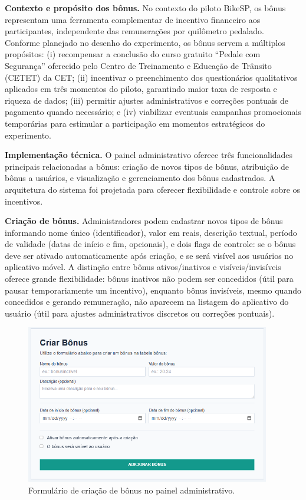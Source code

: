 

\textbf{Contexto e propósito dos bônus.} No contexto do piloto BikeSP, os bônus
representam uma ferramenta complementar de incentivo financeiro aos participantes,
independente das remunerações por quilômetro pedalado. Conforme planejado no desenho
do experimento, os bônus servem a múltiplos propósitos: (i) recompensar a conclusão
do curso gratuito ``Pedale com Segurança'' oferecido pelo Centro de Treinamento e
Educação de Trânsito (CETET) da CET; (ii) incentivar o preenchimento dos
questionários qualitativos aplicados em três momentos do piloto, garantindo maior
taxa de resposta e riqueza de dados; (iii) permitir ajustes administrativos e
correções pontuais de pagamento quando necessário; e (iv) viabilizar eventuais
campanhas promocionais temporárias para estimular a participação em momentos
estratégicos do experimento.

\textbf{Implementação técnica.} O painel administrativo oferece três
funcionalidades principais relacionadas a bônus: criação de novos tipos de bônus,
atribuição de bônus a usuários, e visualização e gerenciamento dos bônus
cadastrados. A arquitetura do sistema foi projetada para oferecer flexibilidade e controle sobre os incentivos.

\textbf{Criação de bônus.} Administradores podem cadastrar novos tipos de bônus
informando nome único (identificador), valor em reais, descrição textual, período
de validade (datas de início e fim, opcionais), e dois flags de controle: se o
bônus deve ser ativado automaticamente após criação, e se será visível aos
usuários no aplicativo móvel. A distinção entre bônus ativos/inativos e
visíveis/invisíveis oferece grande flexibilidade: bônus inativos não podem ser
concedidos (útil para pausar temporariamente um incentivo), enquanto bônus
invisíveis, mesmo quando concedidos e gerando remuneração, não aparecem na
listagem do aplicativo do usuário (útil para ajustes administrativos discretos ou
correções pontuais).

 \begin{figure}[H]
   \centering
   \includegraphics[width=0.95\textwidth]{figuras/criar_bonus.PNG}
   \caption{Formulário de criação de bônus no painel administrativo.}
   \label{fig:bonus_criar_form}
 \end{figure}

